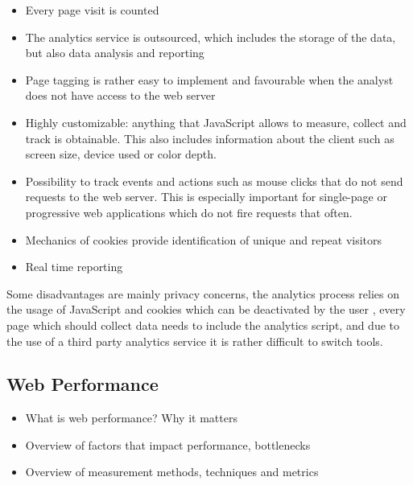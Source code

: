 \begin{itemize}
\item Every page visit is counted %
\item The analytics service is outsourced, which includes the storage of the data, but also data analysis and reporting %
\item Page tagging is rather easy to implement and favourable when the analyst does not have access to the web server %
\item Highly customizable: anything that JavaScript allows to measure, collect and track is obtainable. This also includes information about the client such as screen size, device used or color depth. %
\item Possibility to track events and actions such as mouse clicks that do not send requests to the web server. This is especially important for single-page or progressive web applications which do not fire requests that often. %
\item Mechanics of cookies provide identification of unique and repeat visitors %
\item Real time reporting %
\end{itemize}



Some disadvantages are mainly privacy concerns, the analytics process relies on the usage of JavaScript and cookies which can be deactivated by the user %
, every page which should collect data needs to include the analytics script, and due to the use of a third party analytics service it is rather difficult to switch tools. %









\subsection{Web Performance}

\begin{itemize}
\item What is web performance? Why it matters
\item Overview of factors that impact performance, bottlenecks
\item Overview of measurement methods, techniques and metrics
\end{itemize}

